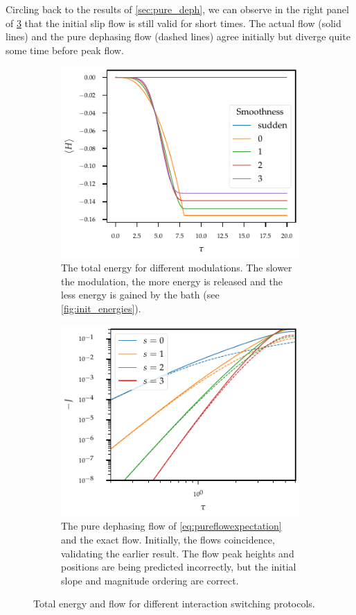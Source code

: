 Circling back to the results of \cref{sec:pure_deph}, we can observe
in the right panel of \cref{fig:init_slip_mod} that the initial slip
flow is still valid for short times.  The actual flow (solid lines)
and the pure dephasing flow (dashed lines) agree initially but diverge
quite some time before peak flow.
\begin{figure}[htp]
  \centering
  \begin{subfigure}[t]{0.49\linewidth}
    \centering\captionsetup{width=.8\linewidth}
    \includegraphics{figs/one_bath_mod/total_init}
    \caption{\label{fig:init_total}The total energy for different
      modulations. The slower the modulation, the more energy is
      released and the less energy is gained by the bath (see
      \cref{fig:init_energies}).}
  \end{subfigure}%
  \begin{subfigure}[t]{0.49\linewidth}
    \centering\captionsetup{width=.8\linewidth}
    \includegraphics{figs/one_bath_mod/initial_slip_modcoup}
    \caption{\label{fig:init_slip_mod} The pure dephasing flow of
      \cref{eq:pureflowexpectation} and the exact flow. Initially, the
      flows coincidence, validating the earlier result. The flow peak
      heights and positions are being predicted incorrectly, but the
      initial slope and magnitude ordering are correct.}
  \end{subfigure}
  \caption{Total energy and flow for different interaction switching
    protocols.}
\end{figure}


